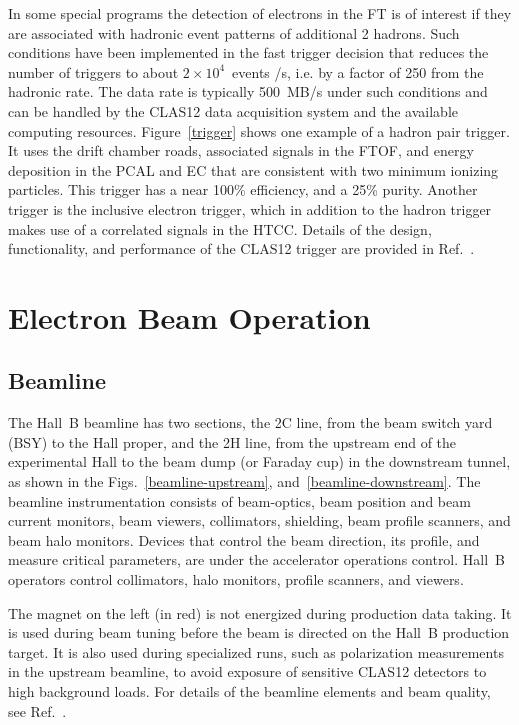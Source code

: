\documentclass[final,3p,twocolumn]{elsarticle}
\begin{document}
In some special programs the detection of electrons in the FT is of interest if they are associated with hadronic event
patterns of additional 2 hadrons. Such conditions have been implemented in the fast trigger decision that reduces the
number of triggers to about $2 \times 10^4$~events /s, i.e. by  a factor of 250 from the hadronic rate. The data rate
is typically 500~MB/s under such conditions and can be handled by the CLAS12 data acquisition system and the available
computing resources. Figure~\ref{trigger} shows one example of a hadron pair trigger. It uses the drift chamber roads,
associated signals in the FTOF, and energy deposition in the PCAL and EC that are consistent with two minimum ionizing
particles. This trigger has a near 100\% efficiency, and a 25\% purity. Another trigger is the inclusive electron trigger,
which in addition to the hadron trigger makes use of a correlated signals in the HTCC. Details of the design, functionality,
and performance of the CLAS12 trigger are provided in  Ref.~\cite{DAQ}. 

\section{Electron Beam Operation} 

\subsection{Beamline}

The Hall~B beamline has two sections, the 2C line, from the beam switch yard (BSY) to the Hall proper, and the 2H line,
from the upstream end of the experimental Hall to the beam dump (or Faraday cup) in the downstream tunnel, as shown
in the Figs.~\ref{beamline-upstream}, and~\ref{beamline-downstream}. The beamline instrumentation consists of
beam-optics, beam position and beam current monitors, beam viewers, collimators,  shielding, beam profile scanners, and
beam halo monitors. Devices that control the beam direction, its profile, and  measure critical parameters, are under the
accelerator operations control. Hall~B operators control collimators, halo monitors, profile scanners, and viewers. 

The magnet on the left (in red) is not energized during production data taking. It is used during beam tuning before the
beam is directed on the Hall~B production target. It is also used during specialized runs, such as polarization measurements
in the upstream beamline, to avoid exposure of sensitive CLAS12 detectors to high background loads. For details of the
beamline elements and beam quality, see Ref.~\cite{beamline}.  
 
\end{document}
